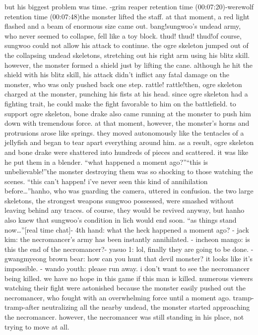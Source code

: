 but his biggest problem was time.
-grim reaper retention time (00:07:20)-werewolf retention time (00:07:48)the monster lifted the staff.
 at that moment, a red light flashed and a beam of enormous size came out.
bang!sungwoo’s undead army, who never seemed to collapse, fell like a toy block.
thud! thud! thud!of course, sungwoo could not allow his attack to continue.
 the ogre skeleton jumped out of the collapsing undead skeletons, stretching out his right arm using his blitz skill.
however, the monster formed a shield just by lifting the cane.
 although he hit the shield with his blitz skill, his attack didn’t inflict any fatal damage on the monster, who was only pushed back one step.
rattle! rattle!then, ogre skeleton charged at the monster, punching his fists at his head.
 since ogre skeleton had a fighting trait, he could make the fight favorable to him on the battlefield.
to support ogre skeleton, bone drake also came running at the monster to push him down with tremendous force.
at that moment, however, the monster’s horns and protrusions arose like springs.
 they moved autonomously like the tentacles of a jellyfish and began to tear apart everything around him.
as a result, ogre skeleton and bone drake were shattered into hundreds of pieces and scattered.
 it was like he put them in a blender.
“what happened a moment ago?”“this is unbelievable!”the monster destroying them was so shocking to those watching the scenes.
“this can’t happen! i’ve never seen this kind of annihilation before…”hanho, who was guarding the camera, uttered in confusion.
 the two large skeletons, the strongest weapons sungwoo possessed, were smashed without leaving behind any traces.
of course, they would be revived anyway, but hanho also knew that sungwoo’s condition in lich would end soon.
“as things stand now…”[real time chat]- 4th hand: what the heck happened a moment ago?
- jack kim: the necromancer’s army has been instantly annihilated.
- incheon mango: is this the end of the necromancer?- yasuo 1: lol, finally they are going to be done.
- gwangmyeong brown bear: how can you hunt that devil monster? it looks like it’s impossible.
- wando youth: please run away.
 i don’t want to see the necromancer being killed.
 we have no hope in this game if this man is killed.
numerous viewers watching their fight were astonished because the monster easily pushed out the necromancer, who fought with an overwhelming force until a moment ago.
tramp- tramp-after neutralizing all the nearby undead, the monster started approaching the necromancer.
 however, the necromancer was still standing in his place, not trying to move at all.
